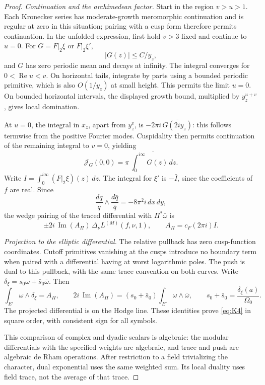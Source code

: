 \begin{proof}
\emph{Continuation and the archimedean factor.}
Start in the region \(v>u>1\).
Each Kronecker series has moderate-growth meromorphic continuation
and is regular at zero in this situation; pairing with a cusp form
therefore permits continuation.  In the unfolded expression, first
hold \(v>3\) fixed and continue to \(u=0\).
For \(G=F|_2\xi\) or \(F|_2\xi'\),
\[
                  |G(z)|\leq C/y_z,
\]
and \(G\) has zero periodic mean and decays at infinity.  The integral
converges for \(0<\operatorname{Re}u<v\).
On horizontal tails, integrate by parts using a bounded periodic
primitive, which is also \(O(1/y_z)\) at small height.  This permits
the limit \(u=0\).  On bounded horizontal intervals, the displayed
growth bound, multiplied by \(y_z^{u+v}\), gives local domination.

At \(u=0\), the integral in \(x_z\), apart from \(y_z^v\), is
\(-2\pi i\,\overline{G(2iy_z)}\): this follows termwise from the
positive Fourier modes.  Cuspidality then permits continuation of
the remaining integral to \(v=0\), yielding
\[
           \mathcal J_G(0,0)
                 =\pi\,\overline{\int_0^{i\infty}G(z)\,dz}.
\]
Write \(I=\int_0^{i\infty}(F|_2\xi)(z)\,dz\).
The integral for \(\xi'\) is \(-\bar I\), since the coefficients
of \(f\) are real.  Since
\[
        \frac{dq}{q}\wedge\frac{d\bar q}{\bar q}
                                   =-8\pi^2i\,dx\,dy,
\]
the wedge pairing of the traced differential with \(\Pi^*\bar\omega\)
is
\[
       \pm2i\,\operatorname{Im}(A_\Pi)\,
                     \Delta_\nu L^{(M)}(f,\nu,1),
       \qquad A_\Pi=c_F(2\pi i)I.
\]

\emph{Projection to the elliptic differential.}
The relative pullback has zero cusp-function coordinates.
Cutoff primitives vanishing at the cusps introduce no boundary term
when paired with a differential having at worst logarithmic poles.
The push is dual to this pullback, with the same trace convention on
both curves.  Write
\(\delta_\xi=s_0\omega+\bar s_0\bar\omega\).  Then
\[
 \int_{E'}\omega\wedge\delta_\xi=A_\Pi,\qquad
 2i\,\operatorname{Im}(A_\Pi)
   =(s_0+\bar s_0)\int_{E'}\omega\wedge\bar\omega,\qquad
 s_0+\bar s_0=\frac{\delta_\xi(a)}{\Omega_0}.
\]
The projected differential is on the Hodge line.  These identities
prove \eqref{eq:K4} in square order, with consistent sign for all
symbols.

This comparison of complex and dyadic scalars is algebraic:
the modular differentials with the specified weights are algebraic,
and trace and push are algebraic de Rham operations.  After restriction
to a field trivializing the character, dual exponential uses the same
weighted sum.  Its local duality uses field trace, not the average of
that trace.


\end{proof}
